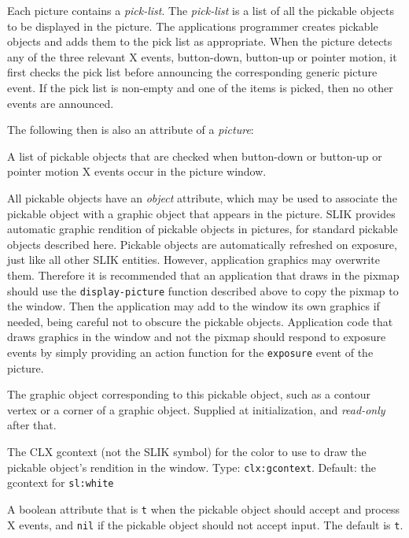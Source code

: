 \documentclass[twoside,openright,11pt]{report}
\newcommand{\tp}[1]{\texttt{#1}}
\begin{document}
Each picture contains a \emph{pick-list\/}.  The \emph{pick-list} is a
list of all the pickable objects to be displayed in the picture.  The
applications programmer creates pickable objects and adds them to the
pick list as appropriate.  When the picture detects any of the three
relevant X events, button-down, button-up or pointer motion, it first
checks the pick list before announcing the corresponding generic
picture event.  If the pick list is non-empty and one of the items is
picked, then no other events are announced.

The following then is also an attribute of a \emph{picture}:

{A list of pickable objects that are checked when button-down or
button-up or pointer motion X events occur in the picture window.}

All pickable objects have an \emph{object\/} attribute, which may be
used to associate the pickable object with a graphic object that
appears in the picture.  SLIK provides automatic graphic rendition of
pickable objects in pictures, for standard pickable objects described
here.  Pickable objects are automatically refreshed on exposure, just
like all other SLIK entities.  However, application graphics may
overwrite them.  Therefore it is recommended that an application that
draws in the pixmap should use the \tp{display-picture} function
described above to copy the pixmap to the window.  Then the
application may add to the window its own graphics if needed, being
careful not to obscure the pickable objects.  Application code that
draws graphics in the window and not the pixmap should respond to
exposure events by simply providing an action function for the
\tp{exposure} event of the picture.


{The graphic object corresponding to this pickable object, such as a
contour vertex or a corner of a graphic object.  Supplied at
initialization, and \emph{read-only} after that.}

{The CLX gcontext (not the SLIK symbol) for the color to use to draw
the pickable object's rendition in the window.  Type:
\tp{clx:gcontext}.  Default: the gcontext for \tp{sl:white}}

{A boolean attribute that is \tp{t} when the pickable object should
accept and process X events, and \tp{nil} if the pickable object
should not accept input.  The default is \tp{t}.}
\end{document}
